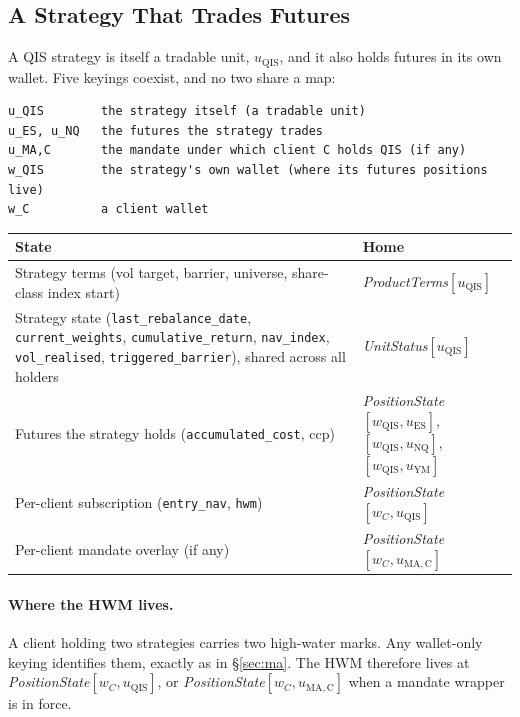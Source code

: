 \documentclass[11pt,a4paper]{article}
\begin{document}
\subsection{A Strategy That Trades Futures}
\label{sec:qis}

A QIS strategy is itself a tradable unit, $u_{\mathrm{QIS}}$, and it also holds futures in
its own wallet. Five keyings coexist, and no two share a map:

\begin{lstlisting}[language={}]
u_QIS        the strategy itself (a tradable unit)
u_ES, u_NQ   the futures the strategy trades
u_MA,C       the mandate under which client C holds QIS (if any)
w_QIS        the strategy's own wallet (where its futures positions live)
w_C          a client wallet
\end{lstlisting}

\begin{longtable}{p{8.6cm}p{6.0cm}}
\toprule
\textbf{State} & \textbf{Home} \\
\midrule
Strategy terms (vol target, barrier, universe, share-class index start) &
\emph{ProductTerms}$[u_{\mathrm{QIS}}]$ \\
Strategy state (\texttt{last\_rebalance\_date}, \texttt{current\_weights},
\texttt{cumulative\_return}, \texttt{nav\_index}, \texttt{vol\_realised},
\texttt{triggered\_barrier}), shared across all holders &
\emph{UnitStatus}$[u_{\mathrm{QIS}}]$ \\
Futures the strategy holds (\texttt{accumulated\_cost}, ccp) &
\emph{PositionState}$[w_{\mathrm{QIS}},u_{\mathrm{ES}}]$, $[w_{\mathrm{QIS}},u_{\mathrm{NQ}}]$,
$[w_{\mathrm{QIS}},u_{\mathrm{YM}}]$ \\
Per-client subscription (\texttt{entry\_nav}, \texttt{hwm}) &
\emph{PositionState}$[w_C,u_{\mathrm{QIS}}]$ \\
Per-client mandate overlay (if any) &
\emph{PositionState}$[w_C,u_{\mathrm{MA,C}}]$ \\
\bottomrule
\end{longtable}

\paragraph{Where the HWM lives.}
A client holding two strategies carries two high-water marks. Any wallet-only keying
identifies them, exactly as in \S\ref{sec:ma}. The HWM therefore lives at
\emph{PositionState}$[w_C,u_{\mathrm{QIS}}]$, or
\emph{PositionState}$[w_C,u_{\mathrm{MA,C}}]$ when a mandate wrapper is in force.
\end{document}

